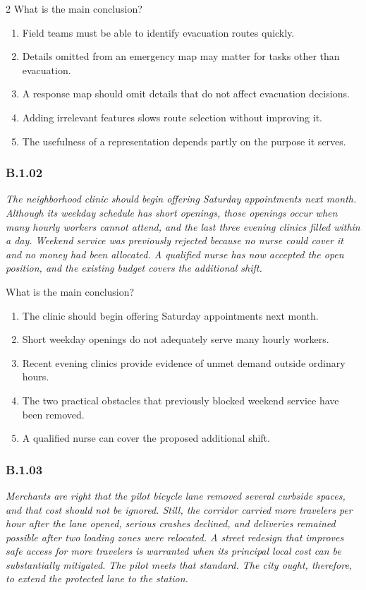 \documentclass[10pt]{extarticle}
\newcommand{\choice}[1]{\item #1}
\newcommand{\bankitem}[1]{\subsubsection*{#1}}
\begin{document}
\begin{multicols}{2}
What is the main conclusion?
\begin{enumerate}[label=(\alph*)]
  \choice{Field teams must be able to identify evacuation routes quickly.}
  \choice{Details omitted from an emergency map may matter for tasks other than evacuation.}
  \choice{A response map should omit details that do not affect evacuation decisions.}
  \choice{Adding irrelevant features slows route selection without improving it.}
  \choice{The usefulness of a representation depends partly on the purpose it serves.}
\end{enumerate}
\bankitem{B.1.02}
\emph{The neighborhood clinic should begin offering Saturday appointments next month. Although its weekday schedule has short openings, those openings occur when many hourly workers cannot attend, and the last three evening clinics filled within a day. Weekend service was previously rejected because no nurse could cover it and no money had been allocated. A qualified nurse has now accepted the open position, and the existing budget covers the additional shift.}

What is the main conclusion?
\begin{enumerate}[label=(\alph*)]
  \choice{The clinic should begin offering Saturday appointments next month.}
  \choice{Short weekday openings do not adequately serve many hourly workers.}
  \choice{Recent evening clinics provide evidence of unmet demand outside ordinary hours.}
  \choice{The two practical obstacles that previously blocked weekend service have been removed.}
  \choice{A qualified nurse can cover the proposed additional shift.}
\end{enumerate}
\bankitem{B.1.03}
\emph{Merchants are right that the pilot bicycle lane removed several curbside spaces, and that cost should not be ignored. Still, the corridor carried more travelers per hour after the lane opened, serious crashes declined, and deliveries remained possible after two loading zones were relocated. A street redesign that improves safe access for more travelers is warranted when its principal local cost can be substantially mitigated. The pilot meets that standard. The city ought, therefore, to extend the protected lane to the station.}


\end{multicols}
\end{document}

